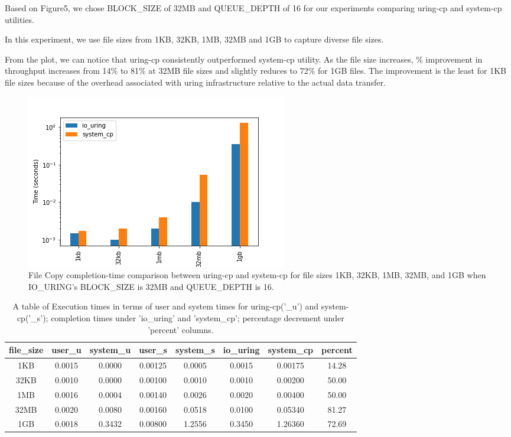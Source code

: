 \documentclass{article}
\begin{document}
Based on Figure5, we chose BLOCK\_SIZE of 32MB and QUEUE\_DEPTH of 16 for our experiments comparing uring-cp and system-cp 
utilities. 

In this experiment, we use file sizes from 1KB, 32KB, 1MB, 32MB and 1GB to capture diverse file sizes.

From the plot, we can notice that uring-cp consistently outperformed system-cp utility. As the file size increases, \% improvement 
in throughput increases from 14\% to 81\% at 32MB file sizes and slightly reduces to 72\% for 1GB files. 
The improvement is the least for 1KB file sizes because of the overhead associated with uring infrastructure relative to the 
actual data transfer. 

\begin{figure}
    \centering
    \includegraphics[scale = 0.6]{cp_perf_compare.png}
    \caption{File Copy completion-time comparison between uring-cp and system-cp for file sizes
    1KB, 32KB, 1MB, 32MB, and 1GB when IO\_URING's BLOCK\_SIZE is 32MB and QUEUE\_DEPTH is 16.}
    \label{Figure6}
\end{figure}

\begin{table}
\centering
\begin{tabular}{|c|c|c|c|c|c|c|c|}

    \hline
    file\_size & user\_u & system\_u & user\_s & system\_s & io\_uring & system\_cp & percent \\
    \hline
    1KB    &   0.0015  & 0.0000 &0.00125 &  0.0005  & 0.0015 &  0.00175 &14.28 \\
    \hline
    32KB   &   0.0010  & 0.0000 &0.00100 &  0.0010  & 0.0010 &  0.00200 &50.00 \\
    \hline
    1MB    &   0.0016  & 0.0004 &0.00140 &  0.0026  & 0.0020 &  0.00400 &50.00 \\
    \hline
    32MB   &   0.0020  & 0.0080 &0.00160 &  0.0518  & 0.0100 &  0.05340 &81.27 \\
    \hline
    1GB    &   0.0018  & 0.3432 &0.00800 &  1.2556  & 0.3450 &  1.26360 &72.69 \\
    \hline

\end{tabular}
\caption{\label{tab:widgets}A table of Execution times in terms of user and system times for uring-cp('\_u') 
and system-cp('\_s'); completion times under 'io\_uring' and 'system\_cp'; percentage decrement under 
'percent' columns.}
\vspace{0.5cm}
\end{table}
\end{document}
